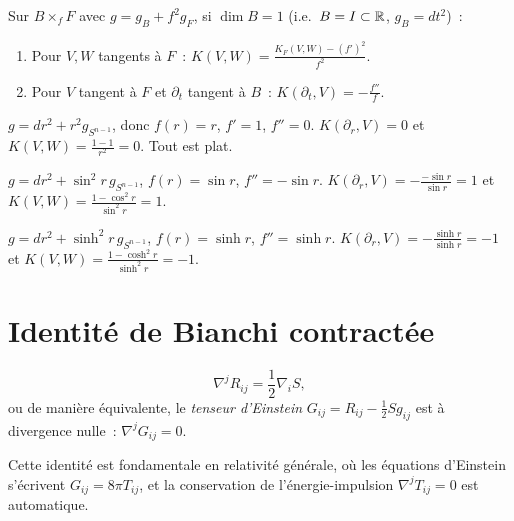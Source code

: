 \begin{proposition}
Sur $B \times_f F$ avec $g = g_B + f^2 g_F$, si $\dim B = 1$ (i.e.\ $B = I \subset \mathbb{R}$,
$g_B = dt^2$)~:
\begin{enumerate}
    \item Pour $V, W$ tangents \`a $F$~:
    $K(V, W) = \frac{K_F(V,W) - (f')^2}{f^2}$.
    \item Pour $V$ tangent \`a $F$ et $\partial_t$ tangent \`a $B$~:
    $K(\partial_t, V) = -\frac{f''}{f}$.
\end{enumerate}
\end{proposition}

\begin{exemple}
$g = dr^2 + r^2 g_{S^{n-1}}$, donc $f(r) = r$, $f' = 1$, $f'' = 0$.
$K(\partial_r, V) = 0$ et $K(V, W) = \frac{1 - 1}{r^2} = 0$. Tout est plat.
\end{exemple}

\begin{exemple}
$g = dr^2 + \sin^2\!r\, g_{S^{n-1}}$, $f(r) = \sin r$, $f'' = -\sin r$.
$K(\partial_r, V) = -\frac{-\sin r}{\sin r} = 1$ et
$K(V,W) = \frac{1 - \cos^2 r}{\sin^2 r} = 1$.
\end{exemple}

\begin{exemple}
$g = dr^2 + \sinh^2\!r\, g_{S^{n-1}}$, $f(r) = \sinh r$, $f'' = \sinh r$.
$K(\partial_r, V) = -\frac{\sinh r}{\sinh r} = -1$ et
$K(V,W) = \frac{1 - \cosh^2 r}{\sinh^2 r} = -1$.
\end{exemple}

\section{Identit\'e de Bianchi contract\'ee}

\begin{theoreme}
\[
    \nabla^j R_{ij} = \frac{1}{2}\nabla_i S,
\]
ou de mani\`ere \'equivalente, le \emph{tenseur d'Einstein}
$G_{ij} = R_{ij} - \frac{1}{2}Sg_{ij}$ est \`a divergence nulle~:
$\nabla^j G_{ij} = 0$.
\end{theoreme}

\begin{remarque}
Cette identit\'e est fondamentale en relativit\'e g\'en\'erale, o\`u les \'equations
d'Einstein s'\'ecrivent $G_{ij} = 8\pi T_{ij}$, et la conservation de
l'\'energie-impulsion $\nabla^j T_{ij} = 0$ est automatique.
\end{remarque}

